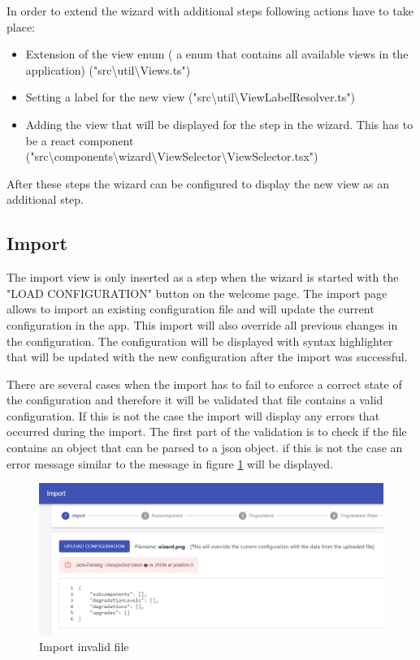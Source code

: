 \noindent In order to extend the wizard with additional steps following actions have to take place:

\begin{itemize}
    \item Extension of the view enum ( a enum that contains all available views in the application) ("src\textbackslash util\textbackslash Views.ts")
    \item Setting a label for the new view ("src\textbackslash util\textbackslash ViewLabelResolver.ts")
    \item Adding the view that will be displayed for the step in the wizard. This has to be a react component ("src\textbackslash components\textbackslash wizard\textbackslash ViewSelector\textbackslash ViewSelector.tsx")
\end{itemize}

\noindent After these steps the wizard can be configured to display the new view as an additional step.

\subsection{Import}
The import view is only inserted as a step when the wizard is started with the "LOAD CONFIGURATION" button on the welcome page. The import page allows to import an existing configuration file and will update the current configuration in the app. This import will also override all previous changes in the configuration. The configuration will be displayed with syntax highlighter that will be updated with the new configuration after the import was successful. 

There are several cases when the import has to fail to enforce a correct state of the configuration and therefore it will be validated that file contains a valid configuration. If this is not the case the import will display any errors that occurred during the import. The first part of the validation is to check if the file contains an object that can be parsed to a json object. if this is not the case an error message similar to the message in figure \ref{fig:import_invalid_file} will be displayed.

\begin{figure}[ht]
    \centering
    \includegraphics[width=\textwidth]{img/import_invalid_file.png}
    \caption{Import invalid file}
    \label{fig:import_invalid_file}
\end{figure}

